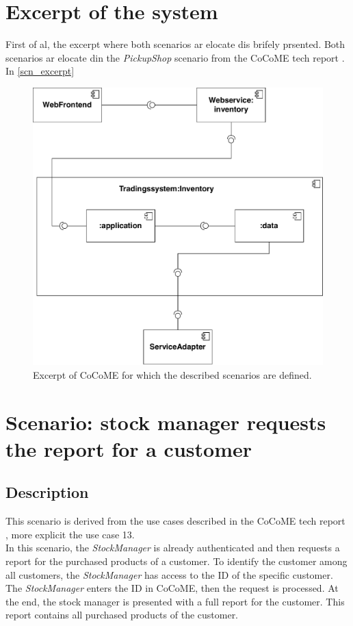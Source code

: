 \section{Excerpt of the system}
First of al, the excerpt where both scenarios ar elocate dis brifely prsented. Both scenarios ar elocate din the \textit{PickupShop} scenario from the CoCoME tech report \cite{CoCoMETechReport}. In \autoref{scn_excerpt} 
\begin{figure}
\includegraphics[scale=0.8]{logos/ExcerptUC13.pdf}
\caption{Excerpt of CoCoME for which the described scenarios are defined.}
\label{scn_excerpt}
\end{figure}
\section{Scenario: stock manager requests the report for a customer}
\label{descripScn_casestudy_scn1} 
\subsection{Description}
This scenario is derived from the use cases described in the CoCoME tech report \cite{CoCoMETechReport}, more explicit the use case 13. \\
In this scenario, the \textit{StockManager} is already authenticated and then requests a report for the purchased products of a customer. To identify the customer among all customers, the \textit{StockManager} has access to the ID of the specific customer. The \textit{StockManager} enters the ID in CoCoME, then the request is processed. At the end, the stock manager is presented with a full report for the customer. This report contains all purchased products of the customer.
